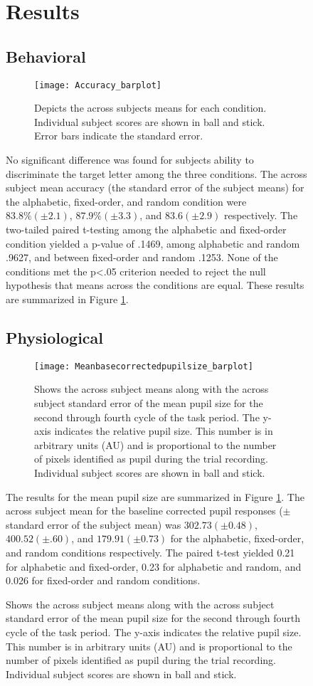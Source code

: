\documentclass[10pt]{article}
\begin{document}
\begin{figure}
\section{Results}

\subsection{Behavioral}

\begin{figure}[t]
  \centering
  \texttt{[image: Accuracy\_barplot]}
  \caption{Depicts the across subjects means for each
  condition.  Individual subject scores are shown in ball and stick.  Error bars
  indicate the standard error.}
  \label{accuracy}
\end{figure}

No significant difference was found for subjects ability to
discriminate the target letter among the three conditions.
The across subject mean accuracy (\pm the standard error of
the subject means) for the alphabetic, fixed-order, and random
condition were $83.8 \% (\pm2.1)$, $87.9 \% (\pm3.3)$,
and $83.6 (\pm 2.9)$ respectively.  The two-tailed paired t-testing among 
the alphabetic and fixed-order condition yielded a p-value of .1469,
among alphabetic and random .9627, and between fixed-order and
random .1253.  None of the conditions met the p<.05 criterion needed
to reject the null hypothesis that means across the conditions are
equal. These results are summarized in Figure \ref{accuracy}.

\subsection{Physiological}

\begin{figure}[t]
  \centering
  \texttt{[image: Meanbasecorrectedpupilsize\_barplot]}
  \caption{Shows the across subject means along with the across
  subject standard error of the mean pupil size for the second
  through fourth cycle of the task period. The y-axis indicates the
  relative pupil size.  This number is in arbitrary units (AU) and
  is proportional to the number of pixels identified as pupil during
  the trial recording. Individual subject scores are shown in ball and stick. }
  \label{psBarplot}
\end{figure}

The results for the mean pupil size are summarized in Figure \ref{accuracy}.
The across subject mean for the baseline corrected pupil responses
($\pm$ standard error of the subject mean) was $ 302.73 (\pm
0.48)$,
$400.52 (\pm .60)$, and $179.91 (\pm 0.73)$ for the alphabetic,
fixed-order, and random conditions respectively.
The paired t-test
yielded 0.21 for alphabetic and fixed-order, 0.23 for alphabetic
and random, and 0.026 for fixed-order and random conditions.


\end{figure}
\end{document}
